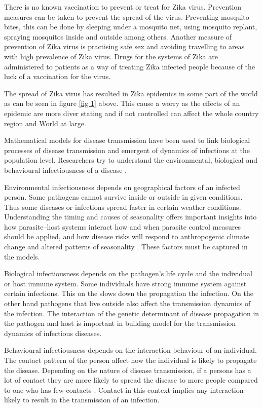 There is no known vaccination to prevent or treat for Zika virus. Prevention measures can be taken to prevent the spread of the virus. Preventing mosquito bites, this can be done by sleeping under a mosquito net, using mosquito replant, spraying mosquitos inside and outside among others. Another measure of prevention of Zika virus is practising safe sex and avoiding travelling to areas with high prevalence of Zika virus. Drugs for the systems of Zika are administered to patients as a way of treating Zika infected people because of the luck of a vaccination for the virus.


The spread of Zika virus has resulted in Zika epidemics in some part of the world as can be seen in figure \ref{fig 1} above. This cause a worry as the effects of an epidemic are more diver stating and if not controlled can affect the whole country region and World at large. 
 
 Mathematical models for disease transmission have been used to link biological processes of disease transmission and emergent of dynamics of infections at the population level. Researchers try to understand the environmental, biological  and behavioural infectiousness of a disease .
 
  Environmental infectiousness depends on geographical factors of an infected person. Some pathogens cannot survive inside or outside in given conditions. Thus some diseases or infections spread faster in certain weather conditions\citep{grass}. Understanding the timing and causes of seasonality offers important insights into how parasite–host systems interact how and when parasite control measures should be applied, and how disease risks will respond to anthropogenic climate change and altered patterns of seasonality \citep{altizer}. These factors must be captured in the models.
  
  Biological infectiousness depends on the pathogen's life cycle and the individual or host immune system. Some individuals have strong immune system against certain infections. This on the slows down the propagation the infection. On the other hand pathogens that live outside also affect the transmission dynamics of the infection.  The interaction of the genetic determinant of disease propagation in the pathogen and host is important in building model for the transmission dynamics of infectious diseases.
  
Behavioural infectiousness depends on the interaction behaviour of an individual. The contact pattern of the person affect how the individual is likely to propagate   the disease. Depending on the nature of disease transmission, if a persons has a lot of contact they are more likely to spread the disease to more people compared to one who has few contacts \citep{johnson2001sexual}. Contact in this context implies any interaction likely to result in the transmission of an infection.

